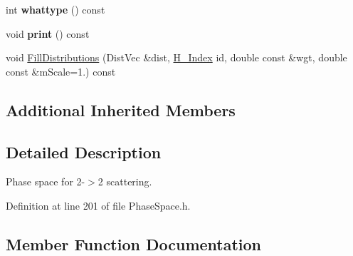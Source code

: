 \begin{DoxyCompactItemize}
\item 
\hypertarget{classPS__2__2_a27ba82e9c32ba391be7df643181de646}{}int {\bfseries whattype} () const \label{classPS__2__2_a27ba82e9c32ba391be7df643181de646}

\item 
\hypertarget{classPS__2__2_af19d44fe30fb72ccfc20f5626f04dcdc}{}void {\bfseries print} () const \label{classPS__2__2_af19d44fe30fb72ccfc20f5626f04dcdc}

\item 
void \hyperlink{classPS__2__2_a253769d43f0d405d6109d16805a4b0c2}{Fill\+Distributions} (Dist\+Vec \&dist, \hyperlink{HistArray_8h_abdf25c9f0ab78c4243f63cb2bacf26d9}{H\+\_\+\+Index} id, double const \&wgt, double const \&m\+Scale=1.) const 
\end{DoxyCompactItemize}
\subsection*{Additional Inherited Members}


\subsection{Detailed Description}
Phase space for 2-\/$>$2 scattering. 

Definition at line 201 of file Phase\+Space.\+h.



\subsection{Member Function Documentation}
\hypertarget{classPS__2__2_a253769d43f0d405d6109d16805a4b0c2}{}
